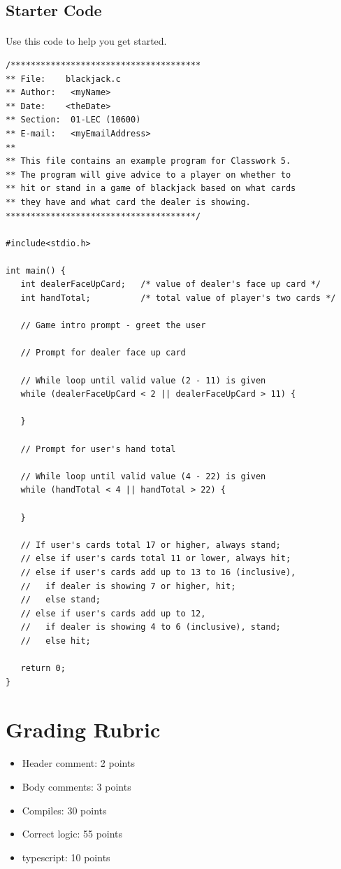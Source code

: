 \documentclass[letter,11pt]{article}
\begin{document}
\subsection*{Starter Code}
\paragraph{}Use this code to help you get started.
\begin{verbatim}
/**************************************
** File:    blackjack.c
** Author:   <myName>
** Date:    <theDate>
** Section:  01-LEC (10600)
** E-mail:   <myEmailAddress>
**
** This file contains an example program for Classwork 5.
** The program will give advice to a player on whether to
** hit or stand in a game of blackjack based on what cards
** they have and what card the dealer is showing.
**************************************/

#include<stdio.h>

int main() {
   int dealerFaceUpCard;   /* value of dealer's face up card */
   int handTotal;          /* total value of player's two cards */

   // Game intro prompt - greet the user

   // Prompt for dealer face up card
   
   // While loop until valid value (2 - 11) is given
   while (dealerFaceUpCard < 2 || dealerFaceUpCard > 11) {
      
   }

   // Prompt for user's hand total
   
   // While loop until valid value (4 - 22) is given
   while (handTotal < 4 || handTotal > 22) {
      
   }

   // If user's cards total 17 or higher, always stand;
   // else if user's cards total 11 or lower, always hit;
   // else if user's cards add up to 13 to 16 (inclusive),
   //   if dealer is showing 7 or higher, hit;
   //   else stand;
   // else if user's cards add up to 12,
   //   if dealer is showing 4 to 6 (inclusive), stand;
   //   else hit;

   return 0;
}
\end{verbatim}

\section*{Grading Rubric}
\begin{itemize}
    \item Header comment: 2 points
    \item Body comments: 3 points
    \item Compiles: 30 points
    \item Correct logic: 55 points
    \item typescript: 10 points
\end{itemize}
\end{document}
